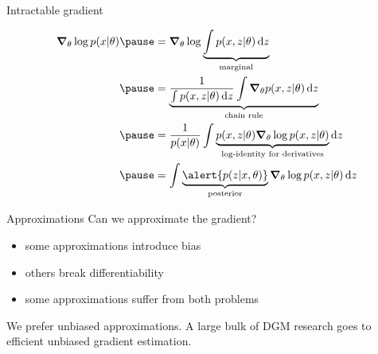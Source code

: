 \begin{frame}{Intractable gradient}

\begin{small}
\begin{equation*}
\begin{aligned}
\grad_\theta \log p(x|\theta) \pause &= \grad_\theta \log \underbrace{\int p(x, z|\theta) \dd{z}}_{\text{marginal}} \\ \pause
&= \underbrace{\frac{1}{\int p(x, z|\theta) \dd{z}} \int \grad_\theta p(x,z|\theta) \dd{z}}_{\text{chain rule}} \\ \pause
&= \frac{1}{p(x|\theta)} \int \underbrace{p(x,z|\theta) \grad_\theta \log p(x,z|\theta)}_{\text{log-identity for derivatives}} \dd{z} \\ \pause
&= \int \underbrace{\alert{p(z|x, \theta)}}_{\text{posterior}} \grad_\theta \log p(x,z|\theta) \dd{z} %
\end{aligned}
\end{equation*}
\end{small}



\end{frame}

\begin{frame}{Approximations}
	Can we approximate the gradient?
	
	\begin{itemize}
		\item some approximations introduce bias
		\item others break differentiability		
		\item some approximations suffer from both problems
	\end{itemize}
	
	We prefer unbiased approximations. A large bulk of DGM research goes to efficient unbiased gradient estimation.
	
\end{frame}

